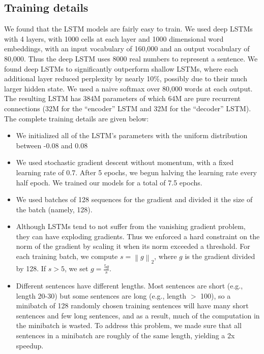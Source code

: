 \subsection{Training details}

We found that the LSTM models are fairly easy to train.  We used deep
LSTMs with 4 layers, with 1000 cells at each layer and 1000
dimensional word embeddings, with an input vocabulary of 160,000
and an output vocabulary of 80,000.  Thus the deep LSTM uses 8000 real 
numbers to represent a sentence. We found deep LSTMs to
significantly outperform shallow LSTMs, where each additional layer
reduced perplexity by nearly 10\%, possibly due to their much larger
hidden state.  We used a naive softmax over 80,000 words at each
output.  The resulting LSTM has 384M parameters of which 64M are pure
recurrent connections (32M for the ``encoder'' LSTM and 32M for the
``decoder'' LSTM). The complete training details are given below:
\begin{itemize}
\item We initialized all of the LSTM's parameters with the uniform distribution between
  -0.08 and 0.08
\item We used stochastic gradient descent without momentum,
  with a fixed learning rate of 0.7.  After 5 epochs, we begun
  halving the learning rate every half epoch.  We trained our models for a
  total of 7.5 epochs.
\item We used batches of 128 sequences for the gradient and divided it
  the size of the batch (namely, 128).
\item Although LSTMs tend to not suffer from the vanishing gradient
  problem, they can have exploding gradients.  Thus we enforced a hard
  constraint on the norm of the gradient
  \cite{graves13c,razvan} by scaling it when its norm exceeded
  a threshold. For each training batch, we compute $s =
  \left\|g\right\|_2$, where $g$ is the gradient divided by 128. If $s > 5$, we set
  $g = \frac{5g}{s}$.
\item Different sentences have different lengths.  Most sentences are
  short (e.g., length 20-30) but some sentences are long (e.g., length
  $>$ 100), so a minibatch of 128 randomly chosen training sentences
  will have many short sentences and few long sentences, and as a
  result, much of the computation in the minibatch is wasted.  To
  address this problem, we made sure that all sentences in a
  minibatch are roughly of the same length, yielding a 2x speedup.
\end{itemize}


